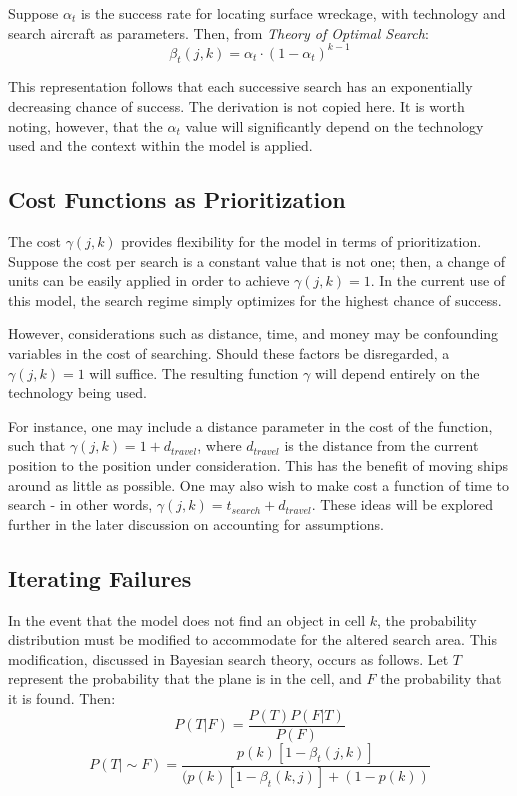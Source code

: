\documentclass[a4paper]{article}
\begin{document}
Suppose $\alpha_t$ is the success rate for locating surface wreckage, with technology and search aircraft as parameters. Then, from \textit{Theory of Optimal Search}: \[\beta_t(j,k)=\alpha_t\cdot(1-\alpha_t)^{k-1}\]

This representation follows that each successive search has an exponentially decreasing chance of success. The derivation is not copied here. It is worth noting, however, that the $\alpha_t$ value will significantly depend on the technology used and the context within the model is applied.

\subsection{Cost Functions as Prioritization}

The cost $\gamma(j,k)$ provides flexibility for the model in terms of prioritization. Suppose the cost per search is a constant value that is not one; then, a change of units can be easily applied in order to achieve $\gamma(j,k)=1$. In the current use of this model, the search regime simply optimizes for the highest chance of success. 

However, considerations such as distance, time, and money may be confounding variables in the cost of searching. Should these factors be disregarded, a $\gamma(j,k)=1$ will suffice. The resulting function $\gamma$ will depend entirely on the technology being used. 

For instance, one may include a distance parameter in the cost of the function, such that $\gamma(j,k)=1+d_{travel}$, where $d_{travel}$ is the distance from the current position to the position under consideration. This has the benefit of moving ships around as little as possible. One may also wish to make cost a function of time to search - in other words, $\gamma(j,k)=t_{search}+d_{travel}$. These ideas will be explored further in the later discussion on accounting for assumptions. 

\subsection{Iterating Failures}

In the event that the model does not find an object in cell $k$, the probability distribution must be modified to accommodate for the altered search area. This modification, discussed in Bayesian search theory, occurs as follows. Let $T$ represent the probability that the plane is in the cell, and $F$ the probability that it is found. Then: 
$$P(T|F)=\frac{P(T)P(F|T)}{P(F)}$$ 
$$P(T|\sim F)=\frac{p(k)[1-\beta_t(j,k)]}{(p(k)[1-\beta_t(k,j)]+(1-p(k))}$$
\end{document}
